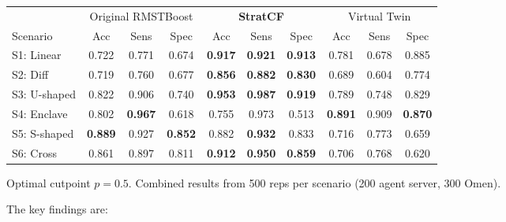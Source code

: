 \documentclass[11pt,letterpaper]{article}
\begin{document}
%

\begin{center}
\begin{tabular}{lccccccccc}
\toprule
 & \multicolumn{3}{c}{Original RMSTBoost} & \multicolumn{3}{c}{\textbf{StratCF}} & \multicolumn{3}{c}{Virtual Twin} \\
\cmidrule{2-4}\cmidrule{5-7}\cmidrule{8-10}
Scenario & Acc & Sens & Spec & Acc & Sens & Spec & Acc & Sens & Spec \\
\midrule
S1: Linear & 0.722 & 0.771 & 0.674 & \textbf{0.917} & \textbf{0.921} & \textbf{0.913} & 0.781 & 0.678 & 0.885 \\
S2: Diff & 0.719 & 0.760 & 0.677 & \textbf{0.856} & \textbf{0.882} & \textbf{0.830} & 0.689 & 0.604 & 0.774 \\
S3: U-shaped & 0.822 & 0.906 & 0.740 & \textbf{0.953} & \textbf{0.987} & \textbf{0.919} & 0.789 & 0.748 & 0.829 \\
S4: Enclave & 0.802 & \textbf{0.967} & 0.618 & 0.755 & 0.973 & 0.513 & \textbf{0.891} & 0.909 & \textbf{0.870} \\
S5: S-shaped & \textbf{0.889} & 0.927 & \textbf{0.852} & 0.882 & \textbf{0.932} & 0.833 & 0.716 & 0.773 & 0.659 \\
S6: Cross & 0.861 & 0.897 & 0.811 & \textbf{0.912} & \textbf{0.950} & \textbf{0.859} & 0.706 & 0.768 & 0.620 \\
\bottomrule
\end{tabular}
\footnotesize Optimal cutpoint $p = 0.5$. Combined results from 500 reps per scenario (200 agent server, 300 Omen).
\end{center}

The key findings are:
\end{document}
